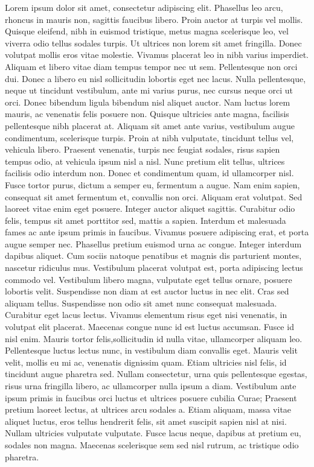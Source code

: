 \documentclass{article}
\begin{document}
\pend
\pstart
Lorem ipsum dolor sit amet, consectetur adipiscing elit. Phasellus leo arcu, rhoncus in mauris non, sagittis faucibus libero. Proin auctor at turpis vel mollis. Quisque eleifend, nibh in euismod tristique, metus magna scelerisque leo, vel viverra odio tellus sodales turpis. Ut ultrices non lorem sit amet fringilla. Donec volutpat mollis eros vitae molestie. Vivamus placerat leo in nibh varius imperdiet. Aliquam et libero vitae diam tempus tempor nec ut sem.
\pend
\pstart
Pellentesque non orci dui. Donec a libero eu nisl sollicitudin lobortis eget nec lacus. Nulla pellentesque, neque ut tincidunt vestibulum, ante mi varius purus, nec cursus neque orci ut orci. Donec bibendum ligula bibendum nisl aliquet auctor. Nam luctus lorem mauris, ac venenatis felis posuere non. Quisque ultricies ante magna, facilisis pellentesque nibh placerat at. Aliquam sit amet ante varius, vestibulum augue condimentum, scelerisque turpis. Proin at nibh vulputate, tincidunt tellus vel, vehicula libero. Praesent venenatis, turpis nec feugiat sodales, risus sapien tempus odio, at vehicula ipsum nisl a nisl. Nunc pretium elit tellus, ultrices facilisis odio interdum non. Donec et condimentum quam, id ullamcorper nisl.
\pend
\pstart
Fusce tortor purus, dictum a semper eu, fermentum a augue. Nam enim sapien, consequat sit amet fermentum et, convallis non orci. Aliquam erat volutpat. Sed laoreet vitae enim eget posuere. Integer auctor aliquet sagittis. Curabitur odio felis, tempus sit amet porttitor sed, mattis a sapien. Interdum et malesuada fames ac ante ipsum primis in faucibus. Vivamus posuere adipiscing erat, et porta augue semper nec.
\pend
\pstart
Phasellus pretium euismod urna ac congue. Integer interdum dapibus aliquet. Cum sociis natoque penatibus et magnis dis parturient montes, nascetur ridiculus mus. Vestibulum placerat volutpat est, porta adipiscing lectus commodo vel. Vestibulum libero magna, vulputate eget tellus ornare, posuere lobortis velit. Suspendisse non diam at est auctor luctus in nec elit. Cras sed aliquam tellus. Suspendisse non odio sit amet nunc consequat malesuada. Curabitur eget lacus lectus. Vivamus elementum risus eget nisi venenatis, in volutpat elit placerat. Maecenas congue nunc id est luctus accumsan. Fusce id nisl enim.
\pend
\pstart
Mauris tortor felis,sollicitudin id nulla vitae, ullamcorper aliquam leo. Pellentesque luctus lectus nunc, in vestibulum diam convallis eget. Mauris velit velit, mollis eu mi ac, venenatis dignissim quam. Etiam ultricies nisl felis, id tincidunt augue pharetra sed. Nullam consectetur, urna quis pellentesque egestas, risus urna fringilla libero, ac ullamcorper nulla ipsum a diam. Vestibulum ante ipsum primis in faucibus orci luctus et ultrices posuere cubilia Curae; Praesent pretium laoreet lectus, at ultrices arcu sodales a. Etiam aliquam, massa vitae aliquet luctus, eros tellus hendrerit felis, sit amet suscipit sapien nisl at nisi. Nullam ultricies vulputate vulputate. Fusce lacus neque, dapibus at pretium eu, sodales non magna. Maecenas scelerisque sem sed nisl rutrum, ac tristique odio pharetra.
\pend
\endnumbering
\printindex
\end{document}
